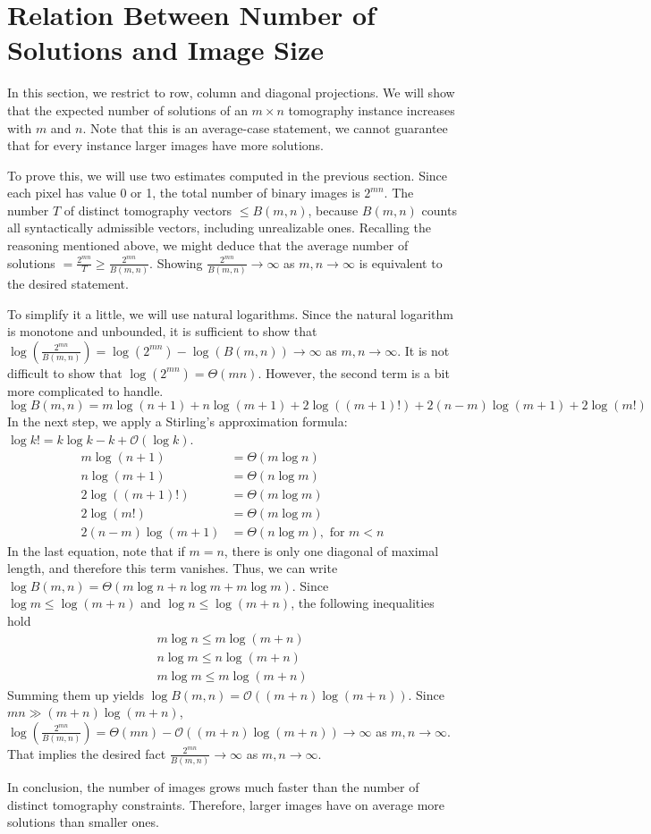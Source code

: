 \documentclass{report}
\begin{document}
\newpage
\section{Relation Between Number of Solutions and Image Size}
In this section, we restrict to row, column and diagonal projections. We will show that the expected number of solutions of an \(m \times n\) tomography instance increases with $m$ and $n$. Note that this is an average-case statement, we cannot guarantee that for every instance larger images have more solutions.

To prove this, we will use two estimates computed in the previous section. Since each pixel has value 0 or 1, the total number of binary images is \(2^{mn}\). The number $T$ of distinct tomography vectors \(\le B(m,n)\), because \(B(m,n)\) counts all syntactically admissible vectors, including unrealizable ones. Recalling the reasoning mentioned above, we might deduce that the average number of solutions \( = \frac{2^{mn}}{T} \ge \frac{2^{mn}}{B(m,n)}\). Showing \(\frac{2^{mn}}{B(m,n)} \to \infty\) as \(m,n \to \infty\) is equivalent to the desired statement.

To simplify it a little, we will use natural logarithms. Since the natural logarithm is monotone and unbounded, it is sufficient to show that \(\log(\frac{2^{mn}}{B(m,n)}) = \log(2^{mn}) - \log(B(m,n)) \to \infty\) as \(m,n \to \infty\). It is not difficult to show that \(\log(2^{mn}) = \Theta(mn)\). However, the second term is a bit more complicated to handle.
\[\log B(m,n) = m\log(n+1) + n\log(m+1) + 2\log((m+1)!) + 2(n-m)\log(m+1) + 2\log(m!)\]
In the next step, we apply a Stirling's approximation formula: \(\log k! = k\log k -k+\mathcal{O}(\log k)\).
\begin{align*}
m \log (n+1) &= \Theta(m\log n) \\
n \log (m+1) &= \Theta(n\log m) \\
2\log((m+1)!) &= \Theta(m \log m) \\
2\log(m!) &= \Theta(m \log m) \\
2(n-m)\log(m+1) &= \Theta(n \log m), \text{ for } m < n 
\end{align*}
In the last equation, note that if \(m = n\), there is only one diagonal of maximal length, and therefore this term vanishes. Thus, we can write \(\log B(m,n) = \Theta(m \log n + n \log m + m \log m)\).
Since \(\log m \le \log (m+n)\) and \(\log n \le \log (m+n)\), the following inequalities hold
\begin{align*}
m \log n \le m\log (m+n) \\
n \log m \le n\log (m+n) \\
m \log m \le m\log (m+n)
\end{align*}
Summing them up yields \(\log B(m,n) = \mathcal{O}((m+n) \log (m+n))\). Since \(mn \gg (m+n) \log (m+n)\), \(\log(\frac{2^{mn}}{B(m,n)}) = \Theta(mn) - \mathcal{O}((m+n) \log (m+n)) \to \infty\) as \(m,n \to \infty\). That implies the desired fact \(\frac{2^{mn}}{B(m,n)} \to \infty\) as \(m,n \to \infty\).

In conclusion, the number of images grows much faster than the number of distinct tomography constraints. Therefore, larger images have on average more solutions than smaller ones.

 


\end{document}
